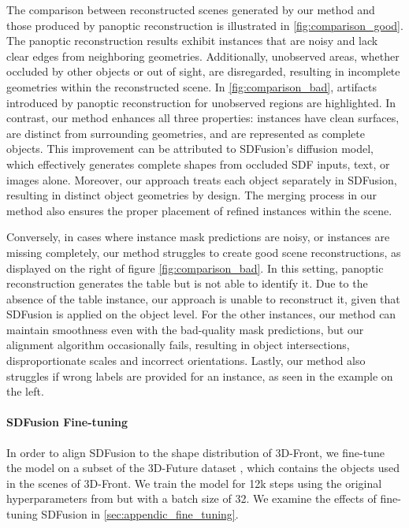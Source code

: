 The comparison between reconstructed scenes generated by our method and those produced by panoptic reconstruction is illustrated in \ref{fig:comparison_good}.
The panoptic reconstruction results exhibit instances that are noisy and lack clear edges from neighboring geometries.
Additionally, unobserved areas, whether occluded by other objects or out of sight, are disregarded, resulting in incomplete geometries within the reconstructed scene.
In \ref{fig:comparison_bad}, artifacts introduced by panoptic reconstruction for unobserved regions are highlighted.
In contrast, our method enhances all three properties: instances have clean surfaces, are distinct from surrounding geometries, and are represented as complete objects.
This improvement can be attributed to SDFusion's diffusion model, which effectively generates complete shapes from occluded SDF inputs, text, or images alone.
Moreover, our approach treats each object separately in SDFusion, resulting in distinct object geometries by design. The merging process in our method also ensures the proper placement of refined instances within the scene.

Conversely, in cases where instance mask predictions are noisy, or instances are missing completely, our method struggles to create good scene reconstructions, as displayed on the right of figure \ref{fig:comparison_bad}. In this setting, panoptic reconstruction generates the table but is not able to identify it. Due to the absence of the table instance, our approach is unable to reconstruct it, given that SDFusion is applied on the object level. For the other instances, our method can maintain smoothness even with the bad-quality mask predictions, but our alignment algorithm occasionally fails, resulting in object intersections, disproportionate scales and incorrect orientations. Lastly, our method also struggles if wrong labels are provided for an instance, as seen in the example on the left.



\paragraph{SDFusion Fine-tuning}
In order to align SDFusion to the shape distribution of 3D-Front, we fine-tune the model on a subset of the 3D-Future dataset \citep{fu20213e}, which contains the objects used in the scenes of 3D-Front.
We train the model for 12k steps using the original hyperparameters from \citet{cheng2023sdfusion} but with a batch size of 32. We examine the effects of fine-tuning SDFusion in \ref{sec:appendic_fine_tuning}.


